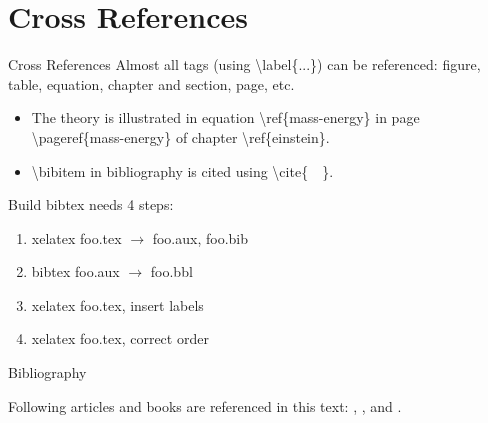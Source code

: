 \documentclass[10pt]{beamer}
\begin{document}
\section{Cross References}
\begin{frame}{Cross References}
    Almost all tags (using \textbackslash label\{...\})
    can be referenced: figure, table, equation,
    chapter and section, page, etc.
\begin{itemize}
    \item The theory is illustrated in equation
        \alert{\textbackslash ref\{mass-energy\}} in page 
        \alert{\textbackslash pageref\{mass-energy\}} of chapter
        \alert{\textbackslash ref\{einstein\}}.

    \item \textbackslash bibitem in bibliography is cited using
        \textbackslash cite\{\ \ \}.
\end{itemize}
Build bibtex needs 4 steps:
\begin{enumerate}
    \item xelatex foo.tex $\to$ foo.aux, foo.bib
    \item bibtex foo.aux  $\to$ foo.bbl
    \item xelatex foo.tex, insert labels
    \item xelatex foo.tex, correct order
\end{enumerate}
\end{frame}

\begin{frame}{Bibliography}

 Following articles and books are referenced in this text:
    \cite{Knuth_texbook}, \cite{texmanual}, \cite{David_tex_land} and
    \cite{website:top500}.


    
    
\end{frame}
\end{document}
